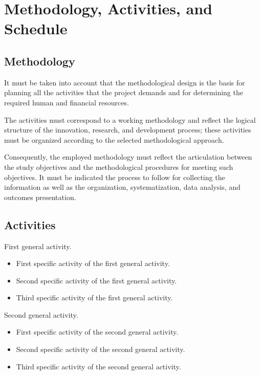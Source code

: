 \section{Methodology, Activities, and Schedule}
\label{sec:methodology}

\subsection{Methodology}
\label{sub:methodology}

It must be taken into account that the methodological design is the basis for planning all the activities that the project demands and for determining the required human and financial resources.

The activities must correspond to a working methodology and reflect the logical structure of the innovation, research, and development process; these activities must be organized according to the selected methodological approach.

Consequently, the employed methodology must reflect the articulation between the study objectives and the methodological procedures for meeting such objectives. It must be indicated the process to follow for collecting the information as well as the organization, systematization, data analysis, and outcomes presentation.

\subsection{Activities}
\label{sub:activities}

First general activity.

\begin{itemize}
    \item First specific activity of the first general activity.
    
    \item Second specific activity of the first general activity.
    
    \item Third specific activity of the first general activity.
\end{itemize}

Second general activity.

\begin{itemize}
    \item First specific activity of the second general activity.
    
    \item Second specific activity of the second general activity.
    
    \item Third specific activity of the second general activity.
\end{itemize}


